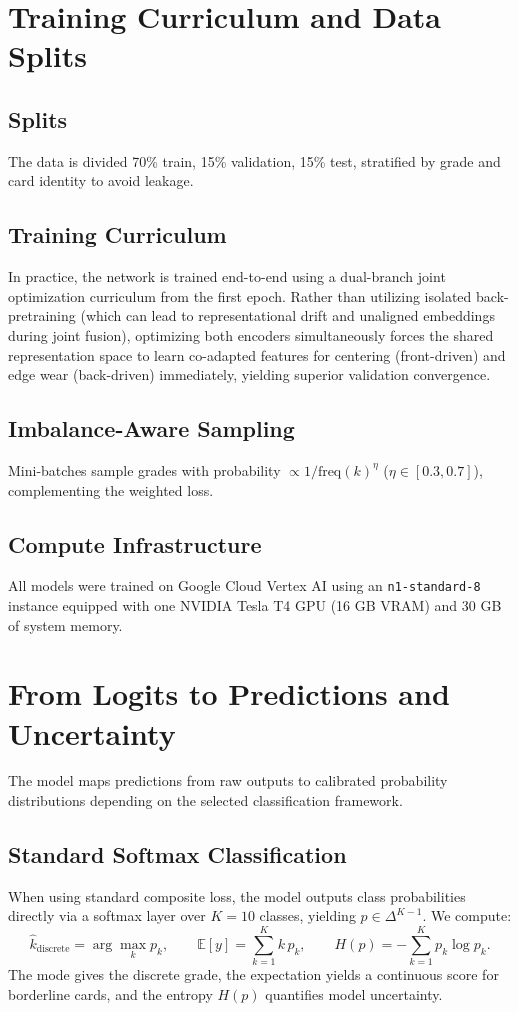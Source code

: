 \documentclass[12pt]{article}
\begin{document}
\section{Training Curriculum and Data Splits}
\subsection{Splits}
The data is divided 70\% train, 15\% validation, 15\% test, stratified by grade and card identity to avoid leakage.

\subsection{Training Curriculum}
In practice, the network is trained end-to-end using a dual-branch joint optimization curriculum from the first epoch. 
Rather than utilizing isolated back-pretraining (which can lead to representational drift and unaligned embeddings during joint fusion), optimizing both encoders simultaneously forces the shared representation space to learn co-adapted features for centering (front-driven) and edge wear (back-driven) immediately, yielding superior validation convergence.

\subsection{Imbalance-Aware Sampling}
Mini-batches sample grades with probability $\propto 1/\text{freq}(k)^\eta$ ($\eta\in[0.3,0.7]$), complementing the weighted loss.

\subsection{Compute Infrastructure}
All models were trained on Google Cloud Vertex AI using an \texttt{n1-standard-8} instance equipped with one NVIDIA Tesla T4 GPU (16 GB VRAM) and 30 GB of system memory.

\section{From Logits to Predictions and Uncertainty}

The model maps predictions from raw outputs to calibrated probability distributions depending on the selected classification framework.

\subsection{Standard Softmax Classification}
When using standard composite loss, the model outputs class probabilities directly via a softmax layer over $K=10$ classes, yielding $p \in \Delta^{K-1}$.
We compute:
\[
\hat{k}_{\text{discrete}} = \arg\max_k p_k, \qquad \mathbb{E}[y] = \sum_{k=1}^{K} k\,p_k, \qquad H(p) = -\sum_{k=1}^{K} p_k \log p_k.
\]
The mode gives the discrete grade, the expectation yields a continuous score for borderline cards, and the entropy $H(p)$ quantifies model uncertainty.
\end{document}
